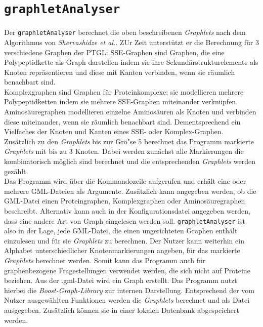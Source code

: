 \documentclass{report}
\begin{document}
\section{\texttt{graphletAnalyser}}

Der \texttt{graphletAnalyser} berechnet die oben beschreibenen \textit{Graphlets} nach dem Algorithmus von \emph{Shervashidze et al.}. ZUr Zeit unterst\"utzt er die Berechnung f\"ur 3 verschiedene Graphen der PTGL: 
SSE-Graphen sind Graphen, die eine Polypeptidkette als Graph darstellen indem sie ihre Sekund\"arstrukturelemente als Knoten repr\"asentieren und diese mit Kanten verbinden, wenn sie r\"aumlich benachbart sind. \\
Komplexgraphen sind Graphen f\"ur Proteinkomplexe; sie modellieren mehrere Polypeptidketten indem sie mehrere SSE-Graphen miteinander verkn\"upfen. \\
Aminos\"auregraphen modellieren einzelne Aminos\"auren als Knoten und verbinden diese miteinander, wenn sie r\"aumlich benachbart sind. Dementsprechend ein Vielfaches der Knoten und Kanten eines SSE- oder Komplex-Graphen. \\
Zus\"atzlich zu den \textit{Graphlets} bis zur Gr\"o"se 5 berechnet das Programm markierte \textit{Graphlets} mit bis zu 3 Knoten. Dabei werden zun\"achst alle Markierungen die kombinatorisch m\"oglich sind berechnet und die entsprechenden \textit{Graphlets} werden gez\"ahlt.\\
Das Programm wird \"uber die Kommandozeile aufgerufen und erh\"alt eine oder mehrere GML-Dateien als Argumente.
Zus\"atzlich kann angegeben werden, ob die GML-Datei einen Proteingraphen, Komplexgraphen oder Aminos\"auregraphen beschreibt.
Alternativ kann auch in der Konfigurationsdatei angegeben werden, dass eine andere Art von Graph eingelesen werden soll.
\texttt{graphletAnalyser} ist also in der Lage, jede GML-Datei, die einen ungerichteten Graphen enth\"alt einzulesen und f\"ur sie \textit{Graphlets} zu berechnen. Der Nutzer kann weiterhin ein Alphabet unterschiedlicher Knotenmarkierungen angeben, f\"ur das markierte \textit{Graphlets} berechnet werden. Somit kann das Programm auch f\"ur graphenbezogene Fragestellungen verwendet werden, die sich nicht auf Proteine beziehen.
Aus der .gml-Datei wird ein Graph erstellt. Das Programm nutzt hierbei die \textit{Boost-Graph-Library} zur internen Darstellung. Entsprechend der vom Nutzer ausgew\"ahlten Funktionen werden die \textit{Graphlets} berechnet und als Datei ausgegeben. Zus\"atzlich k\"onnen sie in einer lokalen Datenbank abgespeichert werden.
\end{document}
